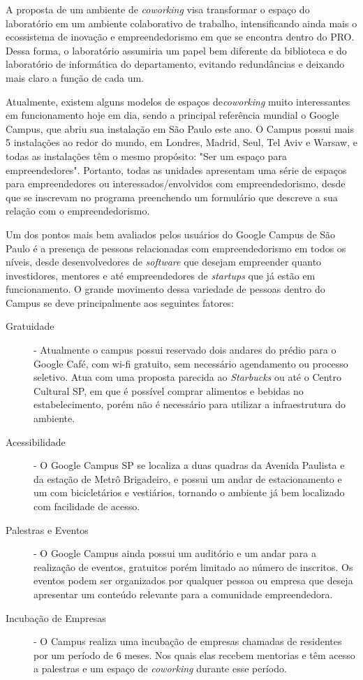 A proposta de um ambiente de \textit{coworking} visa transformar o espaço do laboratório em um ambiente colaborativo de trabalho, intensificando ainda mais o ecossistema de inovação e empreendedorismo em que se encontra dentro do PRO. Dessa forma, o laboratório assumiria um papel bem diferente da biblioteca e do laboratório de informática do departamento, evitando redundâncias e deixando mais claro a função de cada um.

Atualmente, existem alguns modelos de espaços de\textit{coworking} muito interessantes em funcionamento hoje em dia, sendo a principal referência mundial o Google Campus, que abriu sua instalação em São Paulo este ano. O Campus possui mais 5 instalações ao redor do mundo, em Londres, Madrid, Seul,  Tel Aviv e Warsaw, e todas as instalações têm o mesmo propósito: "Ser um espaço para empreendedores". Portanto, todas as unidades apresentam uma série de espaços para empreendedores ou interessados/envolvidos com empreendedorismo, desde que se inscrevam no programa preenchendo um formulário que descreve a sua relação com o empreendedorismo.

Um dos pontos mais bem avaliados pelos usuários do Google Campus de São Paulo é a presença de pessoas relacionadas com empreendedorismo em todos os níveis, desde desenvolvedores de \textit{software} que desejam empreender quanto investidores, mentores e até empreendedores de \textit{startups} que já estão em funcionamento. O grande movimento dessa variedade de pessoas dentro do Campus se deve principalmente aos seguintes fatores: 

\begin{description}
\item[Gratuidade] - Atualmente o campus possui reservado dois andares do prédio para o Google Café, com wi-fi gratuito, sem necessário agendamento ou processo seletivo. Atua com uma proposta parecida ao \textit{Starbucks} ou até o Centro Cultural SP, em que é possível comprar alimentos e bebidas no estabelecimento, porém não é necessário para utilizar a infraestrutura do ambiente.

\item[Acessibilidade] - O Google Campus SP se localiza a duas quadras da Avenida Paulista e da estação de Metrô Brigadeiro, e possui um andar de estacionamento e um com bicicletários e vestiários, tornando o ambiente já bem localizado com facilidade de acesso.

\item[Palestras e Eventos] - O Google Campus ainda possui um auditório e um andar para a realização de eventos, gratuitos porém limitado ao número de inscritos. Os eventos podem ser organizados por qualquer pessoa ou empresa que deseja apresentar um conteúdo relevante para a comunidade empreendedora.

\item[Incubação de Empresas] - O Campus realiza uma incubação de empresas chamadas de residentes por um período de 6 meses. Nos quais elas recebem mentorias e têm acesso a palestras e um espaço de \textit{coworking} durante esse período.
\end{description}

